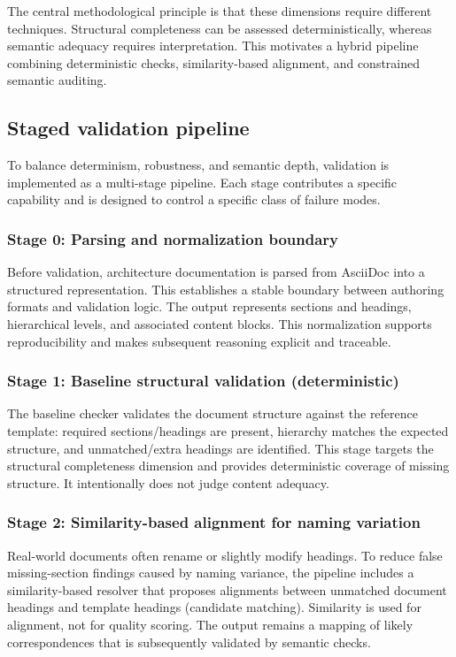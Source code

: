 The central methodological principle is that these dimensions require different techniques. Structural completeness can be assessed deterministically, whereas semantic adequacy requires interpretation. This motivates a hybrid pipeline combining deterministic checks, similarity-based alignment, and constrained semantic auditing.


\subsection{Staged validation pipeline}
To balance determinism, robustness, and semantic depth, validation is implemented as a multi-stage pipeline. Each stage contributes a specific capability and is designed to control a specific class of failure modes.


\subsubsection{Stage 0: Parsing and normalization boundary}
Before validation, architecture documentation is parsed from AsciiDoc into a structured representation. This establishes a stable boundary between authoring formats and validation logic. The output represents sections and headings, hierarchical levels, and associated content blocks. This normalization supports reproducibility and makes subsequent reasoning explicit and traceable.

\subsubsection{Stage 1: Baseline structural validation (deterministic)}
The baseline checker validates the document structure against the reference template: required sections/headings are present, hierarchy matches the expected structure, and unmatched/extra headings are identified. This stage targets the structural completeness dimension and provides deterministic coverage of missing structure. It intentionally does not judge content adequacy.

\subsubsection{Stage 2: Similarity-based alignment for naming variation}
Real-world documents often rename or slightly modify headings. To reduce false missing-section findings caused by naming variance, the pipeline includes a similarity-based resolver that proposes alignments between unmatched document headings and template headings (candidate matching). Similarity is used for alignment, not for quality scoring. The output remains a mapping of likely correspondences that is subsequently validated by semantic checks.

